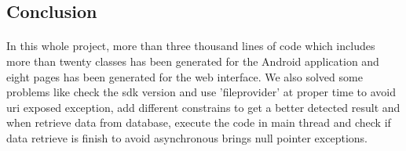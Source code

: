 \subsection{Conclusion}
\paragraph{} 
In this whole project, more than three thousand lines of code which includes more than twenty classes has been generated for the Android application and eight pages has been generated for the web interface. We also solved some problems like check the sdk version and use 'fileprovider' at proper time to avoid uri exposed exception, add different constrains to get a better detected result and when retrieve data from database, execute the code in main thread and check if data retrieve is finish to avoid asynchronous brings null pointer exceptions.   